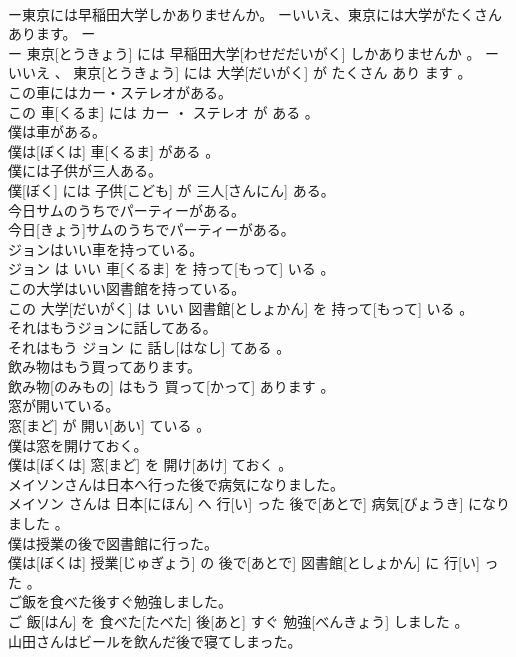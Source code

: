 \documentclass[8pt]{extreport}
\begin{document}
\begin{CJK}{UTF8}{min}
\\	ー東京には早稲田大学しかありませんか。 ーいいえ、東京には大学がたくさんあります。	ー
\\	ー 東京[とうきょう] には 早稲田大学[わせだだいがく] しかありませんか 。 ー いいえ 、 東京[とうきょう] には 大学[だいがく] が たくさん あり ます 。
\\	この車にはカー・ステレオがある。	
\\	この 車[くるま] には カー ・ ステレオ が ある 。
\\	僕は車がある。	
\\	僕は[ぼくは] 車[くるま] がある 。
\\	僕には子供が三人ある。	
\\	僕[ぼく] には 子供[こども] が 三人[さんにん] ある。
\\	今日サムのうちでパーティーがある。	
\\	今日[きょう]サムのうちでパーティーがある。
\\	ジョンはいい車を持っている。	
\\	ジョン は いい 車[くるま] を 持って[もって] いる 。
\\	この大学はいい図書館を持っている。	
\\	この 大学[だいがく] は いい 図書館[としょかん] を 持って[もって] いる 。
\\	それはもうジョンに話してある。	
\\	それはもう ジョン に 話し[はなし] てある 。
\\	飲み物はもう買ってあります。	
\\	飲み物[のみもの] はもう 買って[かって] あります 。
\\	窓が開いている。	
\\	窓[まど] が 開い[あい] ている 。
\\	僕は窓を開けておく。	
\\	僕は[ぼくは] 窓[まど] を 開け[あけ] ておく 。
\\	メイソンさんは日本へ行った後で病気になりました。	
\\	メイソン さんは 日本[にほん] へ 行[い] った 後で[あとで] 病気[びょうき] になりました 。
\\	僕は授業の後で図書館に行った。	
\\	僕は[ぼくは] 授業[じゅぎょう] の 後で[あとで] 図書館[としょかん] に 行[い] った 。
\\	ご飯を食べた後すぐ勉強しました。	
\\	ご 飯[はん] を 食べた[たべた] 後[あと] すぐ 勉強[べんきょう] しました 。
\\	山田さんはビールを飲んだ後で寝てしまった。	

\end{CJK}
\end{document}
